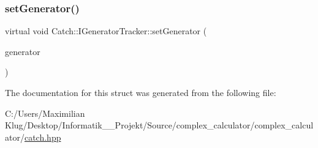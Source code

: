 \subsubsection{\texorpdfstring{set\+Generator()}{setGenerator()}}
{\footnotesize\ttfamily virtual void Catch\+::\+I\+Generator\+Tracker\+::set\+Generator (\begin{DoxyParamCaption}\item[{\mbox{\hyperlink{namespace_catch_1_1_generators_a1519f304113619d7d18670e2f08276c0}{Generators\+::\+Generator\+Base\+Ptr}} \&\&}]{generator }\end{DoxyParamCaption})\hspace{0.3cm}{\ttfamily [pure virtual]}}



The documentation for this struct was generated from the following file\+:\begin{DoxyCompactItemize}
\item 
C\+:/\+Users/\+Maximilian Klug/\+Desktop/\+Informatik\+\_\+\_\+\+Projekt/\+Source/complex\+\_\+calculator/complex\+\_\+calculator/\mbox{\hyperlink{catch_8hpp}{catch.\+hpp}}\end{DoxyCompactItemize}
